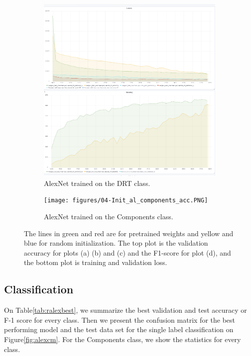 \begin{figure}
\begin{subfigure}{.5\textwidth}
  \centering
  \includegraphics[width=.8\linewidth]{figures/04-Init_al_drt_acc.PNG}
  \caption{AlexNet trained on the DRT class.}
  \label{fig:alexinit_drt}
\end{subfigure}%
\begin{subfigure}{.5\textwidth}
  \centering
  \texttt{[image: figures/04-Init\_al\_components\_acc.PNG]}
  \caption{AlexNet trained on the Components class.}
  \label{fig:alexinit_compo}
\end{subfigure}
\caption{The lines in green and red are for pretrained weights and yellow and blue for random initialization. The top plot is the validation accuracy for plots (a) (b) and (c) and the F1-score for plot (d), and the bottom plot is training  and validation loss.}
\label{fig:plotsalex}
\end{figure}

\subsection{Classification}
On Table\ref{tab:ralexbest}, we summarize the best validation and test accuracy or F-1 score for every class. Then we present the confusion matrix for the best performing model and the test data set for the single label classification on Figure\ref{fig:alexcm}. For the Components class, we show the statistics for every class. 

